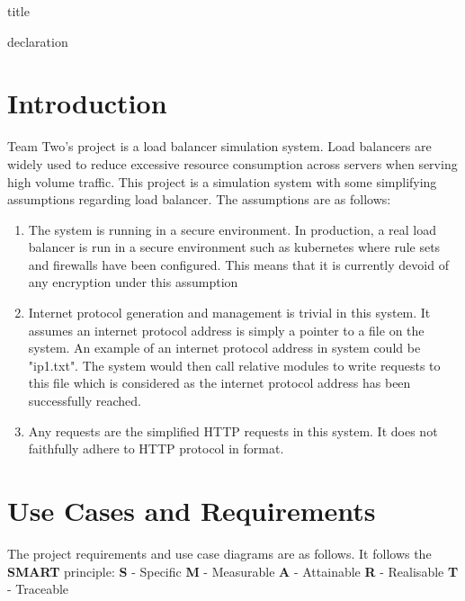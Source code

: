 \documentclass[12pt]{article}
\begin{document}
{title}

{declaration}

\frontmatter

\tableofcontents

\mainmatter

\section{Introduction}
\label{section: intro}
Team Two's project is a load balancer simulation system. Load balancers are widely used to reduce excessive resource consumption across servers when serving high volume traffic. This project is a simulation system with some simplifying assumptions regarding load balancer. The assumptions are as follows:

\begin{enumerate}
    \item The system is running in a secure environment. In production, a real load balancer is run in a secure environment such as kubernetes where rule sets and firewalls have been configured. This means that it is currently devoid of any encryption under this assumption
    \item  Internet protocol generation and management is trivial in this system. It assumes an internet protocol address is simply a pointer to a file on the system. An example of an internet protocol address in system could be "ip1.txt". The system would then call relative modules to write requests to this file which is considered as the internet protocol address has been successfully reached.
    \item Any requests are the simplified HTTP requests in this system. It does not faithfully adhere to HTTP protocol in format.
\end{enumerate}

\section{Use Cases and Requirements}
\label{section: use_case_and_requirements}
The project requirements and use case diagrams are as follows. It follows the \textbf{SMART} principle: \textbf{S} - Specific \textbf{M} - Measurable \textbf{A} - Attainable \textbf{R} - Realisable \textbf{T} - Traceable
\end{document}
